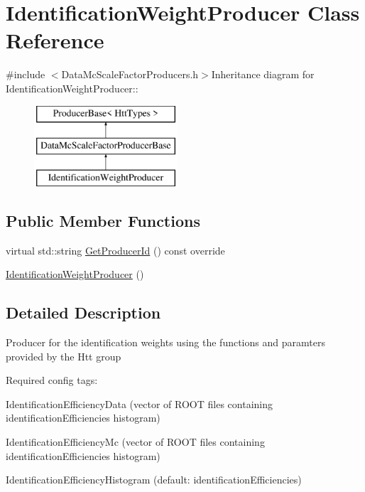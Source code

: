 \hypertarget{classIdentificationWeightProducer}{
\section{IdentificationWeightProducer Class Reference}
\label{classIdentificationWeightProducer}
}


{\ttfamily \#include $<$DataMcScaleFactorProducers.h$>$}Inheritance diagram for IdentificationWeightProducer::\begin{figure}[H]
\begin{center}
\leavevmode
\includegraphics[height=3cm]{classIdentificationWeightProducer}
\end{center}
\end{figure}
\subsection*{Public Member Functions}
\begin{DoxyCompactItemize}
\item 
virtual std::string \hyperlink{classIdentificationWeightProducer_abbf54fd2f0f78f6a4489734373ab6788}{GetProducerId} () const override
\item 
\hyperlink{classIdentificationWeightProducer_a1fb06b51eec690fc9332fe060853e444}{IdentificationWeightProducer} ()
\end{DoxyCompactItemize}


\subsection{Detailed Description}
Producer for the identification weights using the functions and paramters provided by the Htt group

Required config tags:
\begin{DoxyItemize}
\item IdentificationEfficiencyData (vector of ROOT files containing identificationEfficiencies histogram)
\item IdentificationEfficiencyMc (vector of ROOT files containing identificationEfficiencies histogram)
\item IdentificationEfficiencyHistogram (default: identificationEfficiencies) 
\end{DoxyItemize}

